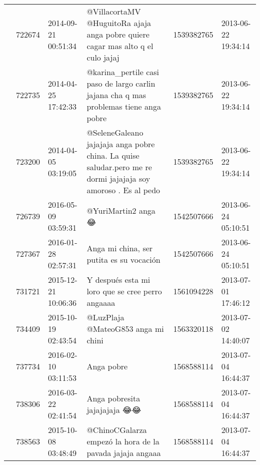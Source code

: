 \begin{tabular}{llllrl}
           & 722674  & 2014-09-21 00:51:34 &                                                              @VillacortaMV @HuguitoRa ajaja anga pobre quiere cagar mas alto q el culo jajaj &  1539382765 & 2013-06-22 19:34:14 \\
           & 722735  & 2014-04-25 17:42:33 &                                                        @karina\_pertile casi paso de largo carlin jajana cha q mas problemas tiene anga pobre &  1539382765 & 2013-06-22 19:34:14 \\
           & 723200  & 2014-04-05 03:19:05 &                                @SeleneGaleano jajajaja anga pobre china. La quise saludar.pero me re dormi jajajaja soy amoroso . Es al pedo &  1539382765 & 2013-06-22 19:34:14 \\
           & 726739  & 2016-05-09 03:59:31 &                                                                                                                          @YuriMartin2 anga 😂 &  1542507666 & 2013-06-24 05:10:51 \\
           & 727367  & 2016-01-28 02:57:31 &                                                                                                     Anga mi china, ser putita es su vocación &  1542507666 & 2013-06-24 05:10:51 \\
           & 731721  & 2015-12-21 10:06:36 &                                                                                             Y después esta mi loro que se cree perro angaaaa &  1561094228 & 2013-07-01 17:46:12 \\
           & 734409  & 2015-10-19 02:43:54 &                                                                                                       @LuzPlaja @MateoG853 anga mi chini💞😂😂😂 &  1563320118 & 2013-07-02 14:40:07 \\
           & 737734  & 2016-02-10 03:11:53 &                                                                                                                                   Anga pobre &  1568588114 & 2013-07-04 16:44:37 \\
           & 738306  & 2016-03-22 02:41:54 &                                                                                                                 Anga pobresita jajajajaja 😂😂 &  1568588114 & 2013-07-04 16:44:37 \\
           & 738563  & 2015-10-08 03:48:49 &                                                                                     @ChinoCGalarza empezó la hora de la pavada jajaja angaaa &  1568588114 & 2013-07-04 16:44:37 \\

\end{tabular}
